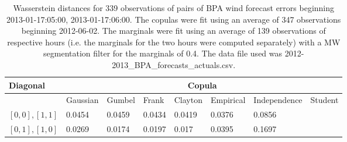 \begin{table}[h] 
    \centering 
    \begin{tabular}{|l|l|l|l|l|l|l|l|} \hline 
        \textbf{Diagonal} & \multicolumn{7}{c|}{\textbf{Copula}} \\ \hline 
        & Gaussian & Gumbel & Frank & Clayton & Empirical & Independence & Student \\ \hline 
        $[0,0], [1,1]$ & 0.0454 & 0.0459 & 0.0434 & 0.0419 & 0.0376 & 0.0856 &  \\ \hline 
        $[0,1], [1,0]$ & 0.0269 & 0.0174 & 0.0197 & 0.017 & 0.0395 & 0.1697 &  \\ \hline 
    \end{tabular} 
    \caption{Wasserstein distances for 339 observations of pairs of BPA wind forecast errors beginning 2013-01-17:05:00, 2013-01-17:06:00. The copulas were fit  using an average of 347 observations beginning 2012-06-02. The marginals were fit using an average of 139 observations of respective hours (i.e. the  marginals for the two hours were computed separately) with a MW segmentation filter for the marginals of 0.4. The data file used was 2012-2013\_BPA\_forecasts\_actuals.csv.} 
\end{table}